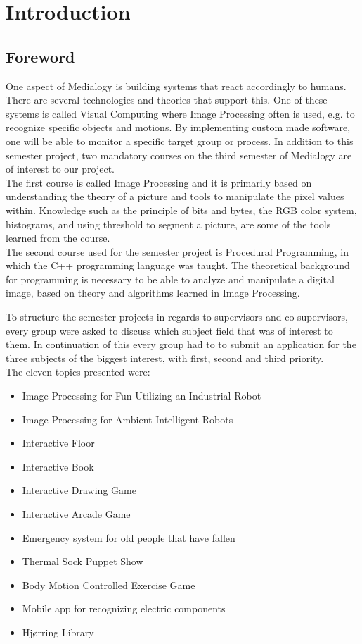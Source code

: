 \chapter{Introduction}
\section{Foreword}
One aspect of Medialogy is building systems that react accordingly to humans. There are several technologies and theories that support this. One of these systems is called Visual Computing where Image Processing often is used, e.g. to recognize specific objects and motions. By implementing custom made software, one will be able to monitor a specific target group or process. In addition to this semester project, two mandatory courses on the third semester of Medialogy are of interest to our  project.\\
The first course is called Image Processing and it is primarily based on understanding the theory of a picture and tools to manipulate the pixel values within. Knowledge such as the principle of bits and bytes, the RGB color system, histograms, and using threshold to segment a picture, are some of the tools learned from the course.\\
The second course used for the semester project is Procedural Programming, in which the C++ programming language was taught. The theoretical background for programming is necessary to be able to analyze and manipulate a digital image, based on theory and algorithms learned in Image Processing.

To structure the semester projects in regards to supervisors and co-supervisors, every group were asked to discuss which subject field that was of interest to them. In continuation of this every group had to to submit an application for the three subjects of the biggest interest, with first, second and third priority.\\
The eleven topics presented were:

\begin{itemize}
\item Image Processing for Fun Utilizing an Industrial Robot
\item Image Processing for Ambient Intelligent Robots
\item Interactive Floor
\item Interactive Book
\item Interactive Drawing Game
\item Interactive Arcade Game
\item Emergency system for old people that have fallen
\item Thermal Sock Puppet Show
\item Body Motion Controlled Exercise Game
\item Mobile app for recognizing electric components
\item Hj{\o}rring Library
\end{itemize}

